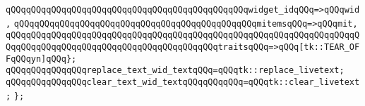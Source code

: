 \verb|qQQqqQQqqQQqqQQqqQQqqQQqqQQqqQQqqQQqqQQqqQQqqQQqwidget_idqQQq=>qQQqwid,|\newline
\verb|qQQqqQQqqQQqqQQqqQQqqQQqqQQqqQQqqQQqqQQqqQQqqQQqmitemsqQQq=>qQQqmit,|\newline
\verb|qQQqqQQqqQQqqQQqqQQqqQQqqQQqqQQqqQQqqQQqqQQqqQQqqQQqqQQqqQQqqQQqqQQqqQQqqQQqqQQqqQQqqQQqqQQqqQQqqQQqqQQqqQQqqQQqtraitsqQQq=>qQQq[tk::TEAR_OFFqQQqyn]qQQq};|\newline
\newline
\verb|qQQqqQQqqQQqqQQqreplace_text_wid_textqQQq=qQQqtk::replace_livetext;|\newline
\verb|qQQqqQQqqQQqqQQqclear_text_wid_textqQQqqQQqqQQq=qQQqtk::clear_livetext;|\newline
\verb|};|\newline
\newline

